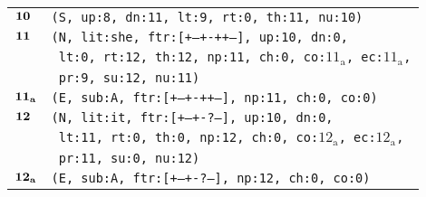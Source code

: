 \documentclass{article}
\begin{document}
\begin{minipage}{\textwidth}
{\begin{tabular}{|r|l|}
    ${\textbf{\textrm{10}}_{\phantom{z}}}$ & \texttt{\texttt{(S,~up:8,~dn:11,~lt:9,~rt:0,~th:11,~nu:10)}} \\
    ${\textbf{\textrm{11}}_{\phantom{z}}}$ & \texttt{\texttt{(N,~lit:she,~ftr:[+--+-++--],~up:10,~dn:0,}} \\
    & \texttt{\texttt{~lt:0,~rt:12,~th:12,~np:11,~ch:0,~co:${\textrm{11}_{\textrm{a}}}$,~ec:${\textrm{11}_{\textrm{a}}}$,}} \\
    & \texttt{\texttt{~pr:9,~su:12,~nu:11)}} \\
    ${\textbf{\textrm{11}}_{\textbf{\textrm{a}}}}$ & \texttt{\texttt{(E,~sub:A,~ftr:[+--+-++--],~np:11,~ch:0,~co:0)}} \\
    ${\textbf{\textrm{12}}_{\phantom{z}}}$ & \texttt{\texttt{(N,~lit:it,~ftr:[+--+-?---],~up:10,~dn:0,}} \\
    & \texttt{\texttt{~lt:11,~rt:0,~th:0,~np:12,~ch:0,~co:${\textrm{12}_{\textrm{a}}}$,~ec:${\textrm{12}_{\textrm{a}}}$,}} \\
    & \texttt{\texttt{~pr:11,~su:0,~nu:12)}} \\
    ${\textbf{\textrm{12}}_{\textbf{\textrm{a}}}}$ & \texttt{\texttt{(E,~sub:A,~ftr:[+--+-?---],~np:12,~ch:0,~co:0)}} \\
    \hline
  \end{tabular}
  }
\end{minipage}
\bigbreak

\bigbreak
\vbox{}
\bigbreak
\end{document}
